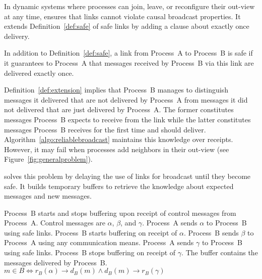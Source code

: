 In dynamic systems where processes can join, leave, or reconfigure their
out-view at any time, \RPCBROADCAST ensures that links cannot violate causal
broadcast properties. It extends Definition~\ref{def:safe} of safe links by
adding a clause about exactly once delivery. 


\begin{definition}
  In addition to Definition~\ref{def:safe}, a link from Process~A to Process~B
  is safe if it guarantees to Process~A that messages received by Process~B via
  this link are delivered exactly once.
\end{definition}

Definition~\ref{def:extension} implies that Process~B manages to distinguish
messages it delivered that are not delivered by Process~A from messages it did
not delivered that are just delivered by Process~A. The former constitutes
messages Process~B expects to receive from the link while the latter constitutes
messages Process~B receives for the first time and should
deliver. Algorithm~\ref{algo:reliablebroadcast} maintains this knowledge over
receipts. However, it may fail when processes add neighbors in their out-view
(see Figure~\ref{fig:generalproblem}).

\RPCBROADCAST solves this problem by delaying the use of links for broadcast
until they become safe. It builds temporary buffers to retrieve the knowledge
about expected messages and new messages.

\begin{definition}
  Process~B starts and stops buffering upon receipt of control messages from
  Process~A. Control messages are $\alpha$, $\beta$, and $\gamma$. Process~A
  sends $\alpha$ to Process~B using safe links. Process~B starts buffering on
  receipt of $\alpha$. Process~B sends $\beta$ to Process~A using any
  communication means. Process~A sends $\gamma$ to Process~B using safe
  links. Process~B stops buffering on receipt of $\gamma$.
  The buffer contains the messages delivered by Process~B. \\
  $m \in B \Longleftrightarrow 
  r_B(\alpha) \rightarrow d_B(m) \wedge d_B(m) \rightarrow r_B(\gamma)$
\end{definition}

